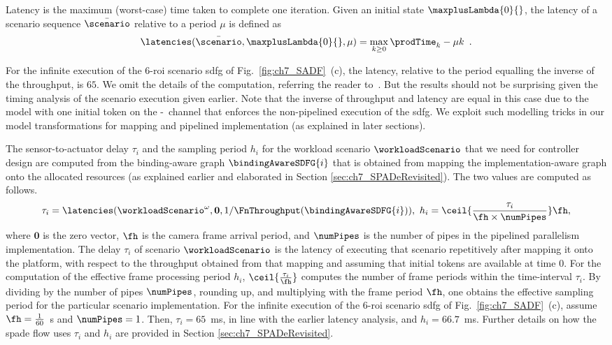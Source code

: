 Latency is the maximum (worst-case) time taken to complete one iteration.
Given an initial state $\maxplusLambda{0}{}$, the latency of a scenario sequence $\bar{\scenario}$ relative to a period $\mu$ is defined as %
\begin{equation}
  \latencies (\bar{\scenario}, \maxplusLambda{0}{}, \mu) = \max\limits_{k \geq 0} \prodTime_k - \mu k\enspace .
  \nonumber
\end{equation}

For the infinite execution of the 6-\gls{roi} scenario \gls{sdfg} of Fig.~\ref{fig:ch7_SADF}~(c), the latency, relative to the period equalling the inverse of the throughput, is $65$. We omit the details of the computation, referring the reader to~\cite{ara2018scalable}. But the results should not be surprising given the timing analysis of the scenario execution given earlier. Note that the inverse of throughput and latency are equal in this case due to the model with one initial token on the \taskA-\taskISP\ channel that enforces the non-pipelined execution of the \gls{sdfg}. We exploit such modelling tricks in our model transformations for mapping and pipelined implementation (as explained in later sections).

The sensor-to-actuator delay $\tau_i$ and the sampling period $h_i$ for the workload scenario $\workloadScenario$ that we need for controller design are computed from the binding-aware graph $\bindingAwareSDFG{i}$ that is obtained from mapping the implementation-aware graph onto the allocated resources (as explained earlier and elaborated in Section \ref{sec:ch7_SPADeRevisited}). The two values are computed as follows.
\begin{equation}
    \tau_i=\latencies (\workloadScenario^\omega, \mathbf{0}, 1/\FnThroughput(\bindingAwareSDFG{i})),\ 
    h_i=\ceil{\frac{\tau_i}{\fh\times \numPipes}}\fh,
    \label{eq:ch7_tau_ih_i}
\end{equation}
where $\mathbf{0}$ is the zero vector, $\fh$ is the camera frame arrival period, and $\numPipes$ is the number of pipes in the pipelined parallelism implementation. The delay $\tau_i$ of scenario $\workloadScenario$ is the latency of executing that scenario repetitively after mapping it onto the platform,  with respect to the throughput obtained from that mapping and assuming that initial tokens are available at time 0.
For the computation of the effective frame processing period $h_i$, $\ceil{\frac{\tau_i}{\fh}}$ computes the number of frame periods within the time-interval $\tau_i$. By dividing by the number of pipes $\numPipes$, rounding up, and multiplying with the frame period $\fh$, one obtains the effective sampling period for the particular scenario implementation. 
For the infinite execution of the 6-\gls{roi} scenario \gls{sdfg} of Fig.~\ref{fig:ch7_SADF}~(c), assume $\fh=\frac{1}{60}$~s and $\numPipes=1$. Then, $\tau_i=65$~ms, in line with the earlier latency analysis, and $h_i=66.7$~ms. 
Further details on how the \gls{spade} flow uses $\tau_i$ and $h_i$ are provided in Section \ref{sec:ch7_SPADeRevisited}.

